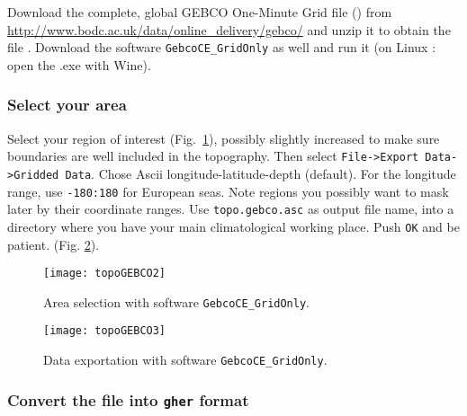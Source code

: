 Download the complete, global GEBCO One-Minute Grid file () from \url{http://www.bodc.ac.uk/data/online\_delivery/gebco/} and unzip it to obtain the file . Download the software \texttt{GebcoCE\_GridOnly} as well and run it (on Linux : open the .exe with Wine). 

\subsubsection{Select your area}

Select your region of interest (Fig.~\ref{fig:gebco1}), possibly slightly increased to make sure boundaries are well included in the topography. Then select {\tt File->Export Data->Gridded Data}. Chose Ascii longitude-latitude-depth (default). For the longitude range, use {\tt -180:180} for European seas. Note regions you possibly want to mask later by their coordinate ranges.  Use {\tt topo.gebco.asc} as output file name, into a directory where
you have your main climatological working place. Push {\tt OK} and be patient. (Fig. \ref{fig:gebco2}). 

\begin{figure}[htpb]
\centering
\texttt{[image: topoGEBCO2]}
\caption{Area selection with software \texttt{GebcoCE\_GridOnly}.\label{fig:gebco1}}
\end{figure}


\begin{figure}[htpb]
\centering
\texttt{[image: topoGEBCO3]}
\caption{Data exportation with software \texttt{GebcoCE\_GridOnly}.\label{fig:gebco2}}
\end{figure}



%


\subsubsection{Convert the file into \texttt{gher} format}


